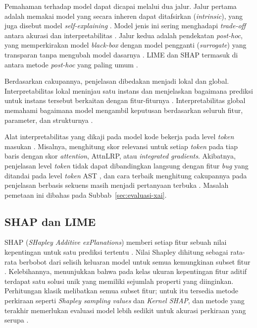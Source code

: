 Pemahaman terhadap model dapat dicapai melalui dua jalur.
Jalur pertama adalah memakai model yang secara inheren dapat ditafsirkan (\textit{intrinsic}),
yang juga disebut model \textit{self-explaining} \autocite{hajimohammadkhani2023}.
Model jenis ini sering menghadapi \textit{trade-off} antara akurasi dan interpretabilitas \autocite{hajimohammadkhani2023}.
Jalur kedua adalah pendekatan \textit{post-hoc}, yang memperkirakan model \textit{black-box}
dengan model pengganti (\textit{surrogate}) yang transparan tanpa mengubah model dasarnya \autocite{hajimohammadkhani2023}.
LIME dan SHAP termasuk di antara metode \textit{post-hoc} yang paling umum \autocite{hajimohammadkhani2023}.

Berdasarkan cakupannya, penjelasan dibedakan menjadi lokal dan global.
Interpretabilitas lokal meninjau satu instans dan menjelaskan bagaimana prediksi untuk instans tersebut berkaitan dengan fitur-fiturnya \autocite{hajimohammadkhani2023}.
Interpretabilitas global memahami bagaimana model mengambil keputusan berdasarkan seluruh fitur, parameter, dan strukturnya \autocite{hajimohammadkhani2023}.

Alat interpretabilitas yang dikaji pada model kode bekerja pada level \textit{token} masukan \autocite{steenhoek2023}.
Misalnya, \textcite{pintore2025} menghitung skor relevansi untuk setiap \textit{token} pada tiap baris
dengan skor \textit{attention}, AttnLRP, atau \textit{integrated gradients}.
Akibatnya, penjelasan level \textit{token} tidak dapat dibandingkan langsung dengan fitur \textit{bug} yang ditandai pada level \textit{token} AST \autocite{steenhoek2023},
dan cara terbaik menghitung cakupannya pada penjelasan berbasis sekuens masih menjadi pertanyaan terbuka \autocite{cheng2024}.
Masalah pemetaan ini dibahas pada Subbab~\ref{sec:evaluasi-xai}.

\subsection{SHAP dan LIME}
\label{sec:shap-lime}
SHAP (\textit{SHapley Additive exPlanations}) memberi setiap fitur sebuah nilai kepentingan untuk satu prediksi tertentu \autocite{lundberg2017}.
Nilai Shapley dihitung sebagai rata-rata berbobot dari selisih keluaran model
untuk semua kemungkinan subset fitur \autocite{lundberg2017}.
Kelebihannya, \textcite{lundberg2017} menunjukkan bahwa pada kelas ukuran kepentingan fitur aditif
terdapat satu solusi unik yang memiliki sejumlah properti yang diinginkan.
Perhitungan klasik melibatkan semua subset fitur;
untuk itu tersedia metode perkiraan seperti \textit{Shapley sampling values} dan \textit{Kernel SHAP},
dan metode yang terakhir memerlukan evaluasi model lebih sedikit untuk akurasi perkiraan yang serupa \autocite{lundberg2017}.

